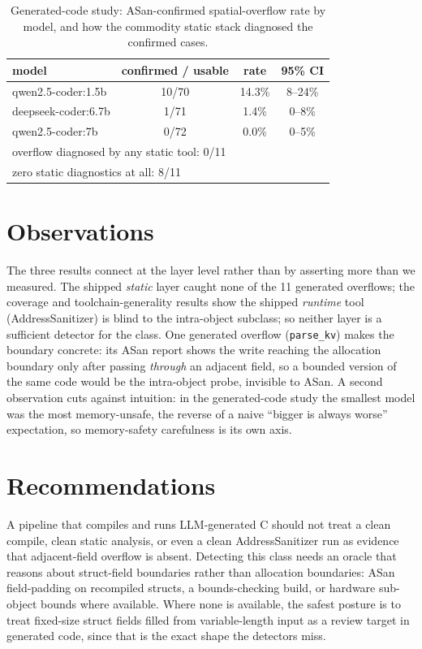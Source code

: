 \documentclass[11pt]{article}
\newcommand{\Nvuln}{11}
\newcommand{\StaticDiag}{0}
\newcommand{\StaticZero}{8}
\begin{document}
\begin{table}[h]\centering
\caption{Generated-code study: ASan-confirmed spatial-overflow rate by model, and how the commodity static
stack diagnosed the confirmed cases.}
\label{tab:h3}
\begin{tabular}{lccc}
\toprule
model & confirmed / usable & rate & 95\% CI \\
\midrule
qwen2.5-coder:1.5b  & 10/70 & 14.3\% & 8--24\% \\
deepseek-coder:6.7b & 1/71  & 1.4\%  & 0--8\% \\
qwen2.5-coder:7b    & 0/72  & 0.0\%  & 0--5\% \\
\midrule
\multicolumn{4}{l}{overflow diagnosed by any static tool: \StaticDiag{}/\Nvuln{}}\\
\multicolumn{4}{l}{zero static diagnostics at all: \StaticZero{}/\Nvuln{}}\\
\bottomrule
\end{tabular}
\end{table}

\section*{Observations}
The three results connect at the layer level rather than by asserting more than we measured.
The shipped \emph{static} layer caught none of the \Nvuln{} generated overflows; the coverage
and toolchain-generality results show the shipped \emph{runtime} tool (AddressSanitizer) is
blind to the intra-object subclass;
so neither layer is a sufficient detector for the class. One generated overflow
(\texttt{parse\_kv}) makes the boundary concrete: its ASan report shows the write reaching the
allocation boundary only after passing \emph{through} an adjacent field, so a bounded version
of the same code would be the intra-object probe, invisible to ASan. A second observation cuts
against intuition: in the generated-code study the smallest model was the most memory-unsafe, the reverse of a naive
``bigger is always worse'' expectation, so memory-safety carefulness is its own axis.

\section*{Recommendations}
A pipeline that compiles and runs LLM-generated C should not treat a clean compile, clean
static analysis, or even a clean AddressSanitizer run as evidence that adjacent-field overflow
is absent. Detecting this class needs an oracle that reasons about struct-field boundaries
rather than allocation boundaries: ASan field-padding on recompiled structs, a bounds-checking
build, or hardware sub-object bounds where available. Where none is available, the safest
posture is to treat fixed-size struct fields filled from variable-length input as a review
target in generated code, since that is the exact shape the detectors miss.
\end{document}

